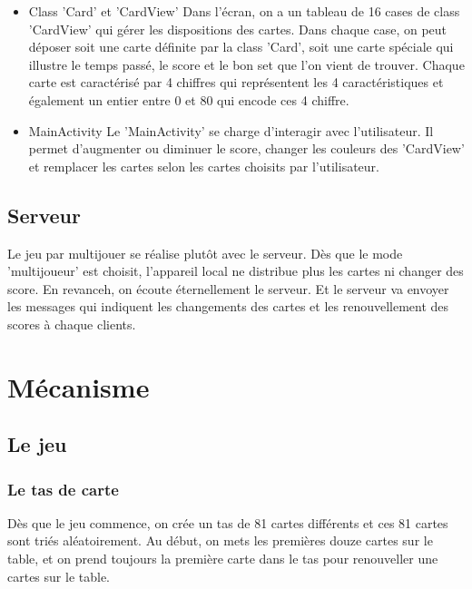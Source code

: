 \documentclass[paper=a4, french]{scrartcl} %
\numberwithin{equation}{section} %
\numberwithin{figure}{section} %
\numberwithin{table}{section} %
\begin{document}
\begin{itemize}
\item Class 'Card' et 'CardView'
Dans l'écran, on a un tableau de 16 cases de class 'CardView' qui gérer les dispositions des cartes. Dans chaque case, on peut déposer soit une carte définite par la class 'Card', soit une carte spéciale qui illustre le temps passé, le score et le bon set que l'on vient de trouver.
Chaque carte est caractérisé par 4 chiffres qui représentent les 4 caractéristiques et également un entier entre 0 et 80 qui encode ces 4 chiffre. 
\item MainActivity
Le 'MainActivity' se charge d'interagir avec l'utilisateur. Il permet d'augmenter ou diminuer le score, changer les couleurs des 'CardView' et remplacer les cartes selon les cartes choisits par l'utilisateur.
\end{itemize}
 
	\subsection{Serveur}

Le jeu par multijouer se réalise plutôt avec le serveur. Dès que le mode 'multijoueur' est choisit, l'appareil local ne distribue plus les cartes ni changer des score. En revanceh, on écoute éternellement le serveur. Et le serveur va envoyer les messages qui indiquent les changements des cartes et les renouvellement des scores à chaque clients.



\section{Mécanisme}

	\subsection{Le jeu}

		\subsubsection{Le tas de carte}
Dès que le jeu commence, on crée un tas de 81 cartes différents et ces 81 cartes sont triés aléatoirement. Au début, on mets les premières douze cartes sur le table, et on prend toujours la première carte dans le tas pour renouveller une cartes sur le table.
\end{document}
